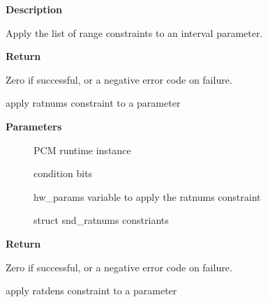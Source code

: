 \documentclass[a4paper,8pt,english]{sphinxmanual}
\begin{document}
\textbf{Description}

Apply the list of range constraints to an interval parameter.

\textbf{Return}

Zero if successful, or a negative error code on failure.

\begin{fulllineitems}
\label{sound/kernel-api/alsa-driver-api:c.snd_pcm_hw_constraint_ratnums}
apply ratnums constraint to a parameter

\end{fulllineitems}


\textbf{Parameters}
\begin{description}
\item[{}] \leavevmode
PCM runtime instance

\item[{}] \leavevmode
condition bits

\item[{}] \leavevmode
hw\_params variable to apply the ratnums constraint

\item[{}] \leavevmode
struct snd\_ratnums constriants

\end{description}

\textbf{Return}

Zero if successful, or a negative error code on failure.

\begin{fulllineitems}
\label{sound/kernel-api/alsa-driver-api:c.snd_pcm_hw_constraint_ratdens}
apply ratdens constraint to a parameter

\end{fulllineitems}
\end{document}
